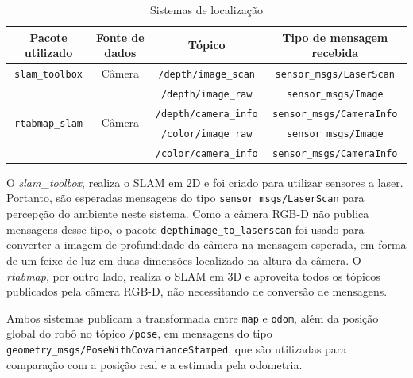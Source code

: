 \documentclass[repeatfields,xlists,xpacks,oneside,yearsonly]{ufrgscca}
\begin{document}
\begin{table}[h]
    \begin{center}
        \caption{Sistemas de localização}
        \label{tab:localizacao}
        \small
        \begin{tabularx}{\linewidth}{c|c|c|c}
            Pacote utilizado                        & Fonte de dados          & Tópico                       & Tipo de mensagem recebida        \\
            \hline
            \texttt{slam\_toolbox}                  & Câmera                  & \texttt{/depth/image\_scan}  & \texttt{sensor\_msgs/LaserScan}  \\
            \hline
            \multirow{4}{*}{\texttt{rtabmap\_slam}} & \multirow{4}{*}{Câmera} & \texttt{/depth/image\_raw}   & \texttt{sensor\_msgs/Image}      \\
                                                    &                         & \texttt{/depth/camera\_info} & \texttt{sensor\_msgs/CameraInfo} \\
                                                    &                         & \texttt{/color/image\_raw}   & \texttt{sensor\_msgs/Image}      \\
                                                    &                         & \texttt{/color/camera\_info} & \texttt{sensor\_msgs/CameraInfo} \\
        \end{tabularx}
    \end{center}
\end{table}

O \textit{slam\_toolbox}, realiza o SLAM em 2D e foi criado para
utilizar sensores a laser. Portanto, são esperadas mensagens do tipo
\texttt{sensor\_msgs/LaserScan} para percepção do ambiente neste
sistema. Como a câmera RGB-D não publica mensagens desse tipo, o
pacote \texttt{depthimage\_to\_laserscan} foi usado para converter a
imagem de profundidade da câmera na mensagem esperada, em forma de um
feixe de luz em duas dimensões localizado na altura da câmera. O
\textit{rtabmap}, por outro lado, realiza o SLAM em 3D e aproveita
todos os tópicos publicados pela câmera RGB-D, não necessitando de
conversão de mensagens.

Ambos sistemas publicam a transformada entre \texttt{map} e
\texttt{odom}, além da posição global do robô no tópico
\texttt{/pose}, em mensagens do tipo
\texttt{geometry\_msgs/PoseWithCovarianceStamped}, que são utilizadas
para comparação com a posição real e a estimada pela odometria.
\end{document}
